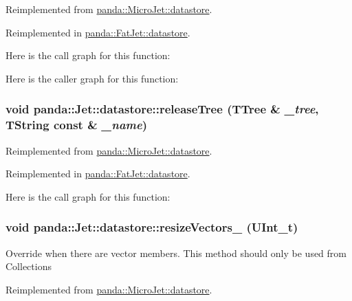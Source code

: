 Reimplemented from \hyperlink{structpanda_1_1MicroJet_1_1datastore_ae893cdc52ad9ae8ffc8a8cea1cac1377}{panda::MicroJet::datastore}.

Reimplemented in \hyperlink{structpanda_1_1FatJet_1_1datastore_a83669574414333b1656878e0ec09c345}{panda::FatJet::datastore}.

Here is the call graph for this function:

Here is the caller graph for this function:\hypertarget{structpanda_1_1Jet_1_1datastore_ae6ac289071c894912c7a60cdd224509f}{
\subsubsection[{releaseTree}]{\setlength{\rightskip}{0pt plus 5cm}void panda::Jet::datastore::releaseTree (TTree \& {\em \_\-tree}, \/  TString const \& {\em \_\-name})}}
\label{structpanda_1_1Jet_1_1datastore_ae6ac289071c894912c7a60cdd224509f}


Reimplemented from \hyperlink{structpanda_1_1MicroJet_1_1datastore_a9722ed3783e57fb5e55307d72ebddb15}{panda::MicroJet::datastore}.

Reimplemented in \hyperlink{structpanda_1_1FatJet_1_1datastore_a8dd1a45fedb7d5ec627601b23f0dc2d5}{panda::FatJet::datastore}.

Here is the call graph for this function:\hypertarget{structpanda_1_1Jet_1_1datastore_a8de9fbcd55c17f7d3d022088f6ded487}{
\subsubsection[{resizeVectors\_\-}]{\setlength{\rightskip}{0pt plus 5cm}void panda::Jet::datastore::resizeVectors\_\- (UInt\_\-t)}}
\label{structpanda_1_1Jet_1_1datastore_a8de9fbcd55c17f7d3d022088f6ded487}


Override when there are vector members. This method should only be used from Collections 

Reimplemented from \hyperlink{structpanda_1_1MicroJet_1_1datastore_a9570f85bfad7f55e239670d0f364cb8b}{panda::MicroJet::datastore}.

